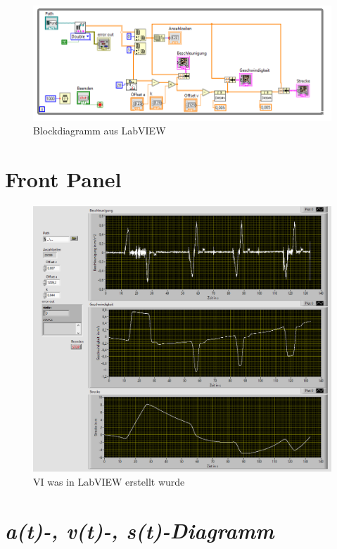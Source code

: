         \begin{figure}[ht!]
            \centering
            \includegraphics[width=\linewidth]{images/blockdiagramm.PNG}
            \caption{Blockdiagramm aus LabVIEW}
            \label{block}
        \end{figure}
    \section{Front Panel}
        \begin{figure}[ht!]
            \centering
            \includegraphics[width=\linewidth]{images/vi.PNG}
            \caption{VI was in LabVIEW erstellt wurde}
            \label{vi}
        \end{figure}
        
    \section{\textit{a(t)-, v(t)-, s(t)-Diagramm}}
        
